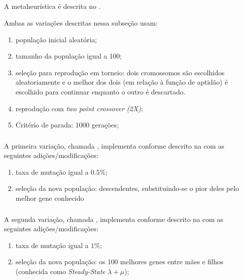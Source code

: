 \subsection{\genetic}
\label{subsection:genetic}

A metaheurística \tabu é descrita no .

Ambas as variações descritas nessa subseção usam:

\begin{enumerate}
    \item população inicial aleatória;
    \item tamanho da população igual a 100;
    \item seleção para reprodução em torneio: dois cromossomos são escolhidos aleatoriamente e o
    melhor dos dois (em relação à função de aptidão) é escolhido para continuar enquanto o outro é
    descartado.
    \item reprodução com \textit{two point crossover (2X)};
    \item Critério de parada: 1000 gerações;
\end{enumerate}

\subsubsection{\geneticVanilla}

A primeira variação, chamada \geneticVanilla, implementa \genetic conforme descrito na  com as seguintes adições/modificações:

\begin{enumerate}
    \item taxa de mutação igual a $0.5\%$;
    \item seleção da nova população: descendentes, substituindo-se o pior deles pelo melhor gene conhecido
\end{enumerate}

\subsubsection{\geneticSteady}

A segunda variação, chamada \geneticSteady, implementa \genetic conforme descrito na  com as seguintes adições/modificações:

\begin{enumerate}
    \item taxa de mutação igual a $1\%$;
    \item seleção da nova população: os 100 melhores genes entre mães e filhos (conhecida como \textit{Steady-State $\lambda + \mu$});
\end{enumerate}
